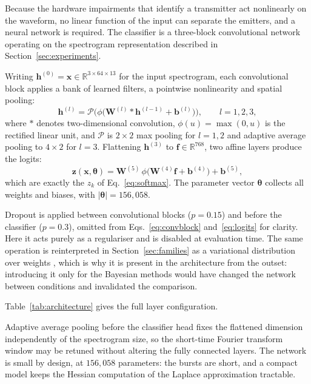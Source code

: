 \documentclass{article}
\begin{document}
Because the hardware impairments that identify a transmitter act nonlinearly on
the waveform, no linear function of the input can separate the emitters, and a
neural network is required. The classifier is a three-block convolutional
network operating on the spectrogram representation described in
Section~\ref{sec:experiments}.

Writing $\mathbf{h}^{(0)} = \mathbf{x} \in \mathbb{R}^{3 \times 64 \times 13}$
for the input spectrogram, each convolutional block applies a bank of learned
filters, a pointwise nonlinearity and spatial pooling:
\begin{equation}
\mathbf{h}^{(l)} =
  \mathcal{P}\Big( \phi\big( \mathbf{W}^{(l)} * \mathbf{h}^{(l-1)} + \mathbf{b}^{(l)} \big) \Big),
\qquad l = 1,2,3,
\label{eq:convblock}
\end{equation}
where $*$ denotes two-dimensional convolution, $\phi(u) = \max(0,u)$ is the
rectified linear unit, and $\mathcal{P}$ is $2\times2$ max pooling for
$l = 1,2$ and adaptive average pooling to $4 \times 2$ for $l = 3$. Flattening
$\mathbf{h}^{(3)}$ to $\mathbf{f} \in \mathbb{R}^{768}$, two affine layers
produce the logits:
\begin{equation}
\mathbf{z}(\mathbf{x}, \boldsymbol{\theta})
= \mathbf{W}^{(5)}\, \phi\big( \mathbf{W}^{(4)} \mathbf{f} + \mathbf{b}^{(4)} \big) + \mathbf{b}^{(5)},
\label{eq:logits}
\end{equation}
which are exactly the $z_k$ of Eq.~\eqref{eq:softmax}. The parameter vector
$\boldsymbol{\theta}$ collects all weights and biases, with
$\lvert\boldsymbol{\theta}\rvert = 156{,}058$.

Dropout is applied between convolutional blocks ($p = 0.15$) and before the
classifier ($p = 0.3$), omitted from Eqs.~\eqref{eq:convblock}
and~\eqref{eq:logits} for clarity. Here it acts purely as a regulariser and is
disabled at evaluation time. The same operation is reinterpreted in
Section~\ref{sec:families} as a variational distribution over weights
\citep{gal2016}, which is why it is present in the architecture from the outset:
introducing it only for the Bayesian methods would have changed the network
between conditions and invalidated the comparison.

Table~\ref{tab:architecture} gives the full layer configuration.


Adaptive average pooling before the classifier head fixes the flattened
dimension independently of the spectrogram size, so the short-time Fourier
transform window may be retuned without altering the fully connected layers.
The network is small by design, at $156{,}058$ parameters: the bursts are short,
and a compact model keeps the Hessian computation of the Laplace
approximation tractable.
\end{document}
